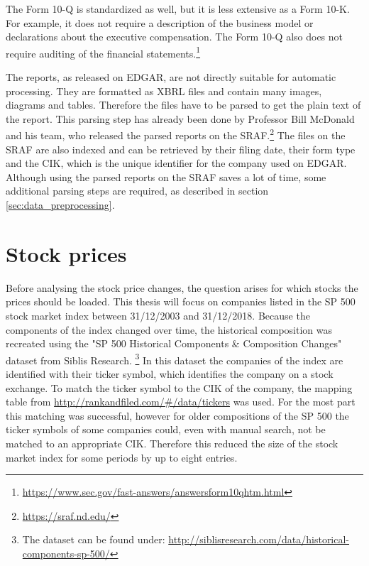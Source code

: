 The Form 10-Q is standardized as well, but it is less extensive as a Form 10-K.
For example, it does not require a description of the business model or declarations about the executive compensation.
The Form 10-Q also does not require auditing of the financial statements.\footnote{\url{https://www.sec.gov/fast-answers/answersform10qhtm.html}}

The reports, as released on \ac{EDGAR}, are not directly suitable for automatic processing.
They are formatted as \ac{XBRL} files and contain many images, diagrams and tables.
Therefore the files have to be parsed to get the plain text of the report.
This parsing step has already been done by Professor Bill McDonald and his team, who released the parsed reports on the \ac{SRAF}.\footnote{\url{https://sraf.nd.edu/}}
The files on the \ac{SRAF} are also indexed and can be retrieved by their filing date, their form type and the \ac{CIK}, which is the unique identifier for the company used on \ac{EDGAR}.
Although using the parsed reports on the \ac{SRAF} saves a lot of time, some additional parsing steps are required, as described in section \ref{sec:data_preprocessing}.


\section{Stock prices}

Before analysing the stock price changes, the question arises for which stocks the prices should be loaded.
This thesis will focus on companies listed in the \ac{SP} 500 stock market index between 31/12/2003 and 31/12/2018.
Because the components of the index changed over time, the historical composition was recreated using the "\ac{SP} 500 Historical Components \& Composition Changes" dataset from Siblis Research. \footnote{The dataset can be found under: \url{http://siblisresearch.com/data/historical-components-sp-500/}}
In this dataset the companies of the index are identified with their ticker symbol, which identifies the company on a stock exchange.
To match the ticker symbol to the \ac{CIK} of the company, the mapping table from \url{http://rankandfiled.com/#/data/tickers} was used.
For the most part this matching was successful, however for older compositions of the \ac{SP} 500 the ticker symbols of some companies could, even with manual search, not be matched to an appropriate \ac{CIK}.
Therefore this reduced the size of the stock market index for some periods by up to eight entries.

